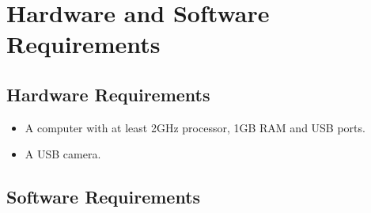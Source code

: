\documentclass[11pt]{report}
\begin{document}
\newpage
\section{Hardware and Software Requirements}
\subsection{Hardware Requirements}
\begin{itemize}
    \item A computer with at least 2GHz processor, 1GB RAM and USB ports.
    \item A USB camera.
\end{itemize}

\subsection{Software Requirements}
\end{document}
